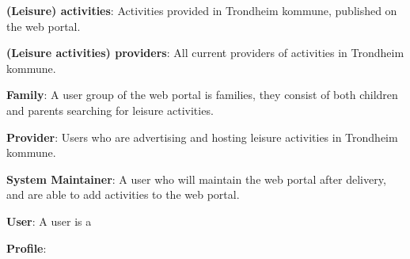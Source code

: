 \textbf{(Leisure) activities}: Activities provided in Trondheim kommune, published on the web portal. 

\textbf{(Leisure activities) providers}: All current providers of activities in Trondheim kommune.  

\textbf{Family}: A user group of the web portal is families, they consist of both children and parents searching for leisure activities.

\textbf{Provider}: Users who are advertising and hosting leisure activities in Trondheim kommune. 

\textbf{System Maintainer}: A user who will maintain the web portal after delivery, and are able to add activities to the web portal.

\textbf{User}: A user is a 

\textbf{Profile}: 

\cleardoublepage